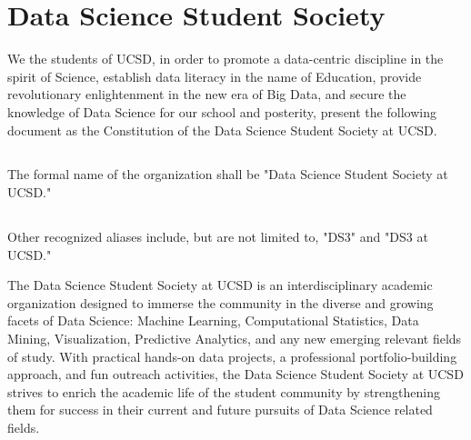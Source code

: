 \documentclass[12pt]{constitution}
\begin{document}


\newpage

\chapter*{Data Science Student Society}

\vspace{-12pt} %

\begin{center}
\end{center}

We the students of UCSD, in order to promote a data-centric discipline in the spirit of Science, establish data literacy in the name of Education, provide revolutionary enlightenment in the new era of Big Data, and secure the knowledge of Data Science for our school and posterity, present the following document as the Constitution of the Data Science Student Society at UCSD.

\section{}The formal name of the organization shall be "Data Science Student Society at UCSD."

\section{}Other recognized aliases include, but are not limited to, "DS3" and "DS3 at UCSD."


\indent The Data Science Student Society at UCSD is an interdisciplinary academic organization designed to immerse the community in the diverse and growing facets of Data Science: Machine Learning, Computational Statistics, Data Mining, Visualization, Predictive Analytics, and any new emerging relevant fields of study. With practical hands-on data projects, a professional portfolio-building approach, and fun outreach activities, the Data Science Student Society at UCSD strives to enrich the academic life of the student community by strengthening them for success in their current and future pursuits of Data Science related fields.
\end{document}
